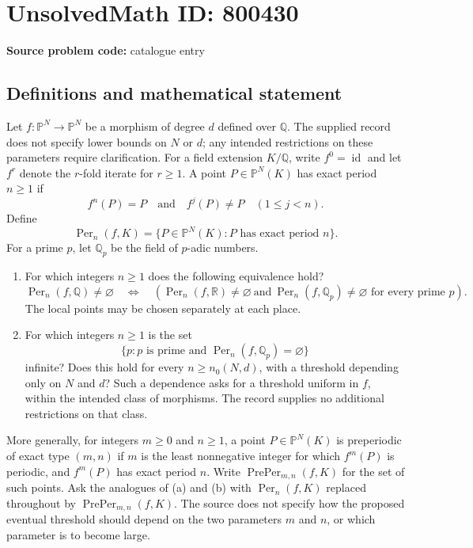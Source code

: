 \documentclass[11pt]{article}
\newcommand{\Q}{\mathbb{Q}}
\newcommand{\R}{\mathbb{R}}
\newcommand{\PP}{\mathbb{P}}
\begin{document}
\section*{UnsolvedMath ID: 800430}
\textbf{Source problem code:} catalogue entry
\subsection{Definitions and mathematical statement}
Let \(f:\PP^N\to\PP^N\) be a morphism of degree \(d\) defined over \(\Q\). The supplied record does not specify lower bounds on \(N\) or \(d\); any intended restrictions on these parameters require clarification. For a field extension \(K/\Q\), write \(f^0=\operatorname{id}\) and let \(f^r\) denote the \(r\)-fold iterate for \(r\geq 1\). A point \(P\in\PP^N(K)\) has exact period \(n\geq 1\) if
\[
f^n(P)=P\quad\text{and}\quad f^j(P)\neq P\quad(1\leq j<n).
\]
Define
\[
\operatorname{Per}_n(f,K)=\{P\in\PP^N(K):P\text{ has exact period }n\}.
\]
For a prime \(p\), let \(\Q_p\) be the field of \(p\)-adic numbers.

\begin{enumerate}
\item[(a)] For which integers \(n\geq 1\) does the following equivalence hold?
\[
\operatorname{Per}_n(f,\Q)\neq\varnothing
\quad\Longleftrightarrow\quad
\left(
\operatorname{Per}_n(f,\R)\neq\varnothing
\ \text{and}\ 
\operatorname{Per}_n(f,\Q_p)\neq\varnothing
\text{ for every prime }p
\right).
\]
The local points may be chosen separately at each place.
\item[(b)] For which integers \(n\geq 1\) is the set
\[
\{p:p\text{ is prime and }\operatorname{Per}_n(f,\Q_p)=\varnothing\}
\]
infinite? Does this hold for every \(n\geq n_0(N,d)\), with a threshold depending only on \(N\) and \(d\)? Such a dependence asks for a threshold uniform in \(f\), within the intended class of morphisms. The record supplies no additional restrictions on that class.
\end{enumerate}

More generally, for integers \(m\geq 0\) and \(n\geq 1\), a point \(P\in\PP^N(K)\) is preperiodic of exact type \((m,n)\) if \(m\) is the least nonnegative integer for which \(f^m(P)\) is periodic, and \(f^m(P)\) has exact period \(n\). Write \(\operatorname{PrePer}_{m,n}(f,K)\) for the set of such points. Ask the analogues of (a) and (b) with \(\operatorname{Per}_n(f,K)\) replaced throughout by \(\operatorname{PrePer}_{m,n}(f,K)\). The source does not specify how the proposed eventual threshold should depend on the two parameters \(m\) and \(n\), or which parameter is to become large.
\end{document}
